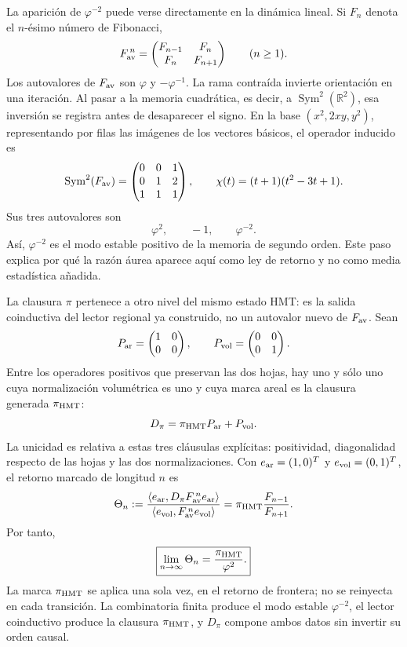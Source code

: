 La aparición de \(\varphi^{-2}\) puede verse directamente en la dinámica
lineal. Si \(F_n\) denota el \(n\)-ésimo número de Fibonacci,
\[
 F_{\rm av}^{\,n}
 =
 \begin{pmatrix}
  F_{n-1}&F_n\\
  F_n&F_{n+1}
 \end{pmatrix}
 \qquad(n\geq1).
\]
Los autovalores de \(F_{\rm av}\) son
\(\varphi\) y \(-\varphi^{-1}\). La rama contraída invierte orientación en
una iteración. Al pasar a la memoria cuadrática, es decir, a
\(\operatorname{Sym}^2(\mathbb R^2)\), esa inversión se registra antes de
desaparecer el signo. En la base \((x^2,2xy,y^2)\), representando por
filas las imágenes de los vectores básicos, el operador inducido es
\[
 \operatorname{Sym}^2(F_{\rm av})=
 \begin{pmatrix}
  0&0&1\\
  0&1&2\\
  1&1&1
 \end{pmatrix},
 \qquad
 \chi(t)=(t+1)(t^2-3t+1).
\]
Sus tres autovalores son
\[
 \varphi^2,\qquad -1,\qquad \varphi^{-2}.
\]
Así, \(\varphi^{-2}\) es el modo estable positivo de la memoria de segundo
orden. Este paso explica por qué la razón áurea aparece aquí como ley de
retorno y no como media estadística añadida.

La clausura \(\pi\) pertenece a otro nivel del mismo estado HMT: es la salida
coinductiva del lector regional ya construido, no un autovalor nuevo de
\(F_{\rm av}\). Sean
\[
 P_{\rm ar}=
 \begin{pmatrix}1&0\\0&0\end{pmatrix},
 \qquad
 P_{\rm vol}=
 \begin{pmatrix}0&0\\0&1\end{pmatrix}.
\]
Entre los operadores positivos que preservan las dos hojas, hay uno y sólo
uno cuya normalización volumétrica es uno y cuya marca areal es la clausura
generada \(\pi_{\rm HMT}\):
\[
 D_\pi=\pi_{\rm HMT}P_{\rm ar}+P_{\rm vol}.
\]
La unicidad es relativa a estas tres cláusulas explícitas: positividad,
diagonalidad respecto de las hojas y las dos normalizaciones. Con
\(e_{\rm ar}=(1,0)^T\) y \(e_{\rm vol}=(0,1)^T\), el retorno marcado de
longitud \(n\) es
\[
 \Theta_n
 :=
 \frac{\langle e_{\rm ar},
 D_\pi F_{\rm av}^{\,n}e_{\rm ar}\rangle}
 {\langle e_{\rm vol},
 F_{\rm av}^{\,n}e_{\rm vol}\rangle}
 =
 \pi_{\rm HMT}\frac{F_{n-1}}{F_{n+1}}.
\]
Por tanto,
\[
 \boxed{\displaystyle
 \lim_{n\to\infty}\Theta_n
 =\frac{\pi_{\rm HMT}}{\varphi^2}.}
\]
La marca \(\pi_{\rm HMT}\) se aplica una sola vez, en el retorno de frontera;
no se reinyecta en cada transición. La combinatoria finita produce el modo
estable \(\varphi^{-2}\), el lector coinductivo produce la clausura
\(\pi_{\rm HMT}\), y \(D_\pi\) compone ambos datos sin invertir su orden
causal.

